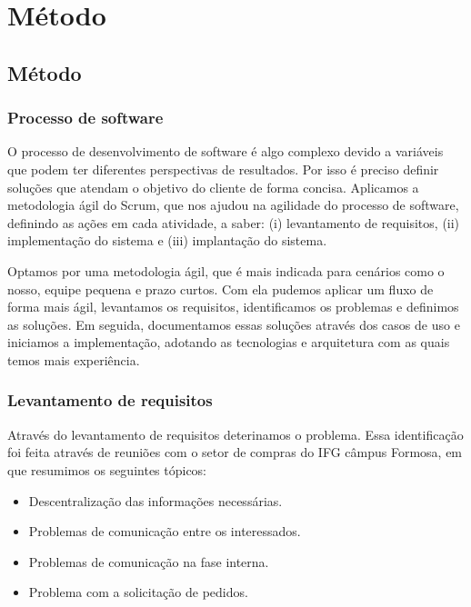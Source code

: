 \part{Método}

\chapter[Método]{Método}\label{Capitulo4}

\section{Processo de software}

O processo de desenvolvimento de software é algo complexo devido a variáveis que podem ter diferentes perspectivas de resultados.
Por isso é preciso definir soluções que atendam o objetivo do cliente de forma concisa. 
Aplicamos a metodologia ágil do Scrum, que nos ajudou na agilidade do processo de software, definindo as ações em cada atividade, a saber: (i) levantamento de requisitos, (ii) implementação do sistema e (iii) implantação do sistema.

Optamos por uma metodologia ágil, que é mais indicada para cenários como o nosso, equipe pequena e prazo curtos.
Com ela pudemos aplicar um fluxo de forma mais ágil, levantamos os requisitos, identificamos os problemas e definimos as soluções.
Em seguida, documentamos essas soluções através dos casos de uso e iniciamos a implementação, adotando as tecnologias e arquitetura com as quais temos mais experiência.

\section{Levantamento de requisitos}

Através do levantamento de requisitos deterinamos o problema.
Essa identificação foi feita através de reuniões com o setor de compras do IFG câmpus Formosa, em que resumimos os seguintes tópicos:

\begin{itemize}
    \item Descentralização das informações necessárias.
    \item Problemas de comunicação entre os interessados.  
    \item Problemas de comunicação na fase interna.  
    \item Problema com a solicitação de pedidos.
\end{itemize}

